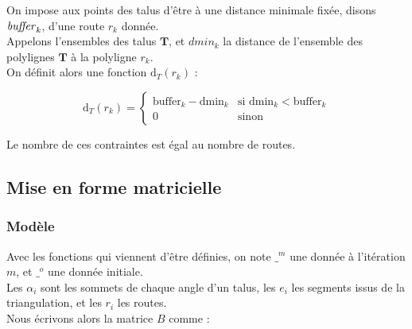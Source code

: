 \documentclass[11pt]{article}
\begin{document}
On impose aux points des talus d'être à une distance minimale fixée, disons $\text{\textit{buffer}}_k$,  d'une route $r_k$ donnée.\\
Appelons l'ensembles des talus $\mathbf{T}$, et $dmin_k$ la distance de l'ensemble des polylignes $\mathbf{T}$ à la polyligne $r_k$. \\
On définit alors une fonction $\text{d}_T(r_k)$ :

\begin{equation}
\text{d}_T(r_k) = 
\begin{cases}
\text{buffer}_k - \text{dmin}_k & \text{si dmin}_k < \text{buffer}_k \\
0 &  \text{sinon}
\end{cases} 
\label{dist_route}
\end{equation}


Le nombre de ces contraintes est égal au nombre de routes.

\subsection{Mise en forme matricielle}

\subsubsection{Modèle}
Avec les fonctions qui viennent d'être définies, on note $\_^m$ une donnée à l'itération $m$, et $\_^o$ une donnée initiale.\\
Les $\alpha_i$ sont les sommets de chaque angle d'un talus,  les $e_i$ les segments issus de la triangulation, et les $r_i$ les routes.\\
Nous écrivons alors la matrice $B$ comme :
\end{document}

